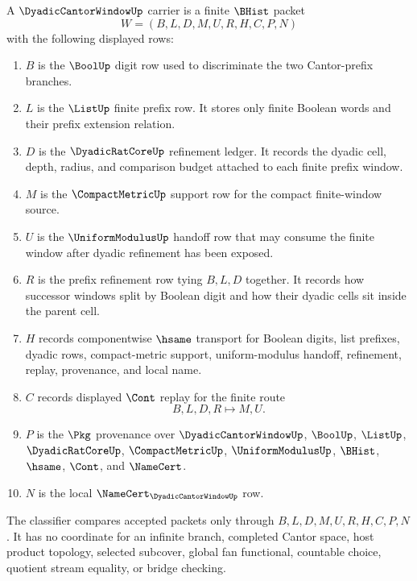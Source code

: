 \begin{definition}
\label{def:dyadic-cantor-window-carrier}
A $\DyadicCantorWindowUp$ carrier is a finite $\BHist$ packet
$$
W=(B,L,D,M,U,R,H,C,P,N)
$$
with the following displayed rows:
\begin{enumerate}
\item $B$ is the $\BoolUp$ digit row used to discriminate the two Cantor-prefix branches.
\item $L$ is the $\ListUp$ finite prefix row. It stores only finite Boolean words and their prefix extension relation.
\item $D$ is the $\DyadicRatCoreUp$ refinement ledger. It records the dyadic cell, depth, radius, and comparison budget attached to each finite prefix window.
\item $M$ is the $\CompactMetricUp$ support row for the compact finite-window source.
\item $U$ is the $\UniformModulusUp$ handoff row that may consume the finite window after dyadic refinement has been exposed.
\item $R$ is the prefix refinement row tying $B,L,D$ together. It records how successor windows split by Boolean digit and how their dyadic cells sit inside the parent cell.
\item $H$ records componentwise $\hsame$ transport for Boolean digits, list prefixes, dyadic rows, compact-metric support, uniform-modulus handoff, refinement, replay, provenance, and local name.
\item $C$ records displayed $\Cont$ replay for the finite route
$$
B,L,D,R \longmapsto M,U .
$$
\item $P$ is the $\Pkg$ provenance over $\DyadicCantorWindowUp$, $\BoolUp$, $\ListUp$, $\DyadicRatCoreUp$, $\CompactMetricUp$, $\UniformModulusUp$, $\BHist$, $\hsame$, $\Cont$, and $\NameCert$.
\item $N$ is the local $\NameCert_{\DyadicCantorWindowUp}$ row.
\end{enumerate}
The classifier compares accepted packets only through $B,L,D,M,U,R,H,C,P,N$. It has no coordinate for an infinite branch, completed Cantor space, host product topology, selected subcover, global fan functional, countable choice, quotient stream equality, or bridge checking.
\end{definition}

